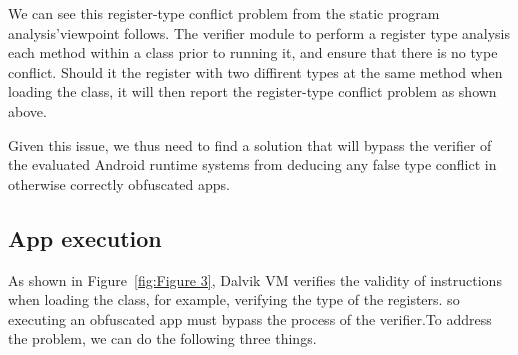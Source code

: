 We can see this register-type conflict problem from the static program analysis'viewpoint follows. The verifier module\cite{35,36} to perform a register type analysis each method within a class prior to running it, and ensure that there is no type conflict. Should it the register with two diffirent types at the same method when loading the class, it will then report the register-type conflict problem as shown above.

Given this issue, we thus need to find a solution that will bypass the verifier of the evaluated Android runtime systems from deducing any false type conflict in otherwise correctly obfuscated apps.




\subsection{App execution}
As shown in Figure~\ref{fig:Figure 3}, Dalvik VM verifies the validity of instructions when loading the class, for example, verifying the type of the registers. so executing an obfuscated app must bypass the process of the verifier.To address the problem, we can do the following three things.

